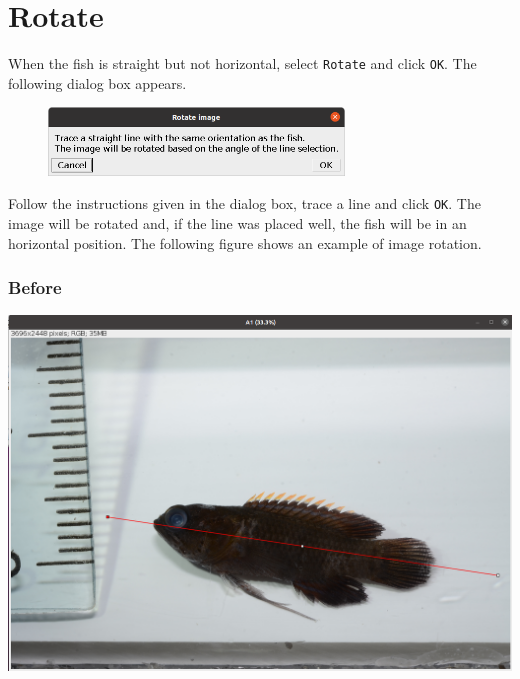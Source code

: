 \documentclass[
  letterpaper,
  DIV=11,
  numbers=noendperiod,
  oneside]{scrreprt}
\begin{document}
\hypertarget{rotate}{%
\section*{Rotate}\label{rotate}}

When the fish is straight but not horizontal, select \texttt{Rotate} and
click \texttt{OK}. The following dialog box appears.

\begin{figure}

{\centering \includegraphics[width=0.7\textwidth,height=\textheight]{./images/screenshots/rotate_dialog.png}

}

\end{figure}

Follow the instructions given in the dialog box, trace a line and click
\texttt{OK}. The image will be rotated and, if the line was placed well,
the fish will be in an horizontal position. The following figure shows
an example of image rotation.

\hypertarget{before-1}{%
\subsubsection{\texorpdfstring{\textbf{Before}}{Before}}\label{before-1}}

\includegraphics{./images/screenshots/rotate_example.png}
\end{document}
